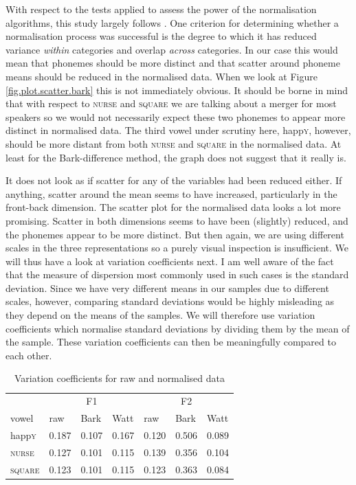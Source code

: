 With respect to the tests applied to assess the power of the normalisation algorithms, this study largely follows \textcite{langstrofdiss}.
One criterion for determining whether a normalisation process was successful is the degree to which it has reduced variance \emph{within} categories and overlap \emph{across} categories.
In our case this would mean that phonemes should be more distinct and that scatter around phoneme means should be reduced in the normalised data.
When we look at Figure \ref{fig.plot.scatter.bark} this is not immediately obvious.
It should be borne in mind that with respect to \textsc{nurse} and \textsc{square} we are talking about a merger for most speakers so we would not necessarily expect these two phonemes to appear more distinct in normalised data.
The third vowel under scrutiny here, happ\textsc{y}, however, should be more distant from both \textsc{nurse} and \textsc{square} in the normalised data.
At least for the Bark-difference method, the graph does not suggest that it really is.

It does not look as if scatter for any of the variables had been reduced either.
If anything, scatter around the mean seems to have increased, particularly in the front-back dimension.
The scatter plot for the \citeauthor{wattfabricius2002} normalised data looks a lot more promising.
Scatter in both dimensions seems to have been (slightly) reduced, and the phonemes appear to be more distinct.
But then again, we are using different scales in the three representations so a purely visual inspection is insufficient.
We will thus have a look at variation coefficients next. I am well aware of the fact that the measure of dispersion most commonly used in such cases is the standard deviation. Since we have very different means in our samples due to different scales, however, comparing standard deviations would be highly misleading as they depend on the means of the samples. We will therefore use variation coefficients which normalise standard deviations by dividing them by the mean of the sample. These variation coefficients can then be meaningfully compared to each other.

\begin{table}[h]
	\centering
	\caption{Variation coefficients for raw and normalised data}
	\begin{tabular}{lllllll}
		\hline
		& \multicolumn{3}{c}{F1} & \multicolumn{3}{c}{F2}\\
		vowel & raw & Bark & Watt & raw & Bark & Watt\\
		\hline
		happ\textsc{y} &
		0.187 & 0.107 & 0.167 &
		0.120 & 0.506 & 0.089\\
		\textsc{nurse} &
		0.127 & 0.101 & 0.115 &
		0.139 & 0.356 & 0.104\\
		\textsc{square} &
		0.123 & 0.101 & 0.115 &
		0.123 & 0.363 & 0.084\\
		\hline
	\end{tabular}
	\label{tab.varcoeff}
\end{table}

